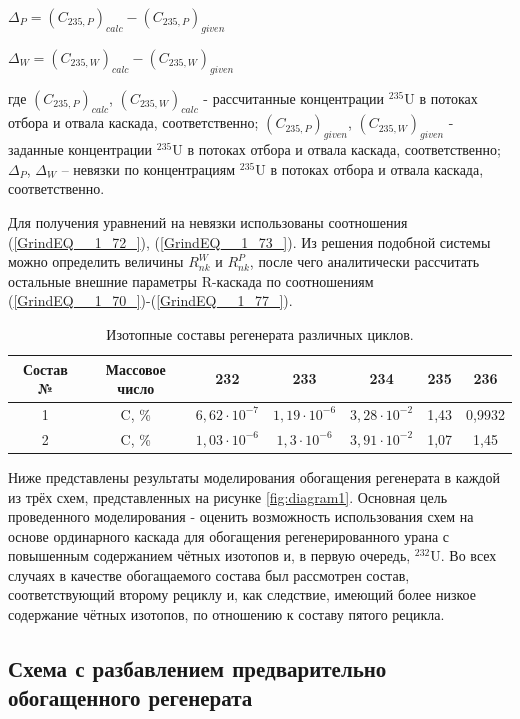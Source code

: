 $\Delta_{P} = {(C_{235, P})}_{calc}-{(C_{235, P})}_{given}$

$\Delta_{W} = {(C_{235, W})}_{calc}-{(C_{235, W})}_{given}$

где ${(C_{235, P})}_{calc}$, ${(C_{235, W})}_{calc}$ - рассчитанные концентрации $^{235}$U в потоках отбора и отвала каскада, соответственно; ${(C_{235, P})}_{given}$, ${(C_{235, W})}_{given}$ - заданные концентрации $^{235}$U в потоках отбора и отвала каскада, соответственно; $\Delta_{P}$, $\Delta_{W}$ -- невязки по концентрациям $^{235}$U в потоках отбора и отвала каскада, соответственно. 

Для получения уравнений на невязки использованы соотношения (\ref{GrindEQ__1_72_}), (\ref{GrindEQ__1_73_}). Из решения подобной системы можно определить величины $R_{n k}^{W}$ и $R_{n k}^{P}$, после чего аналитически рассчитать остальные внешние параметры R-каскада по соотношениям (\ref{GrindEQ__1_70_})-(\ref{GrindEQ__1_77_}).   


\begin{table}[h]
  \centering
  \normalsize\begin{tabulary}{1.0\textwidth}{|c|c|c|c|c|c|c|}
  \hline Состав № & Массовое число & 232 & 233 & 234 & 235 & 236 \\
   & C, \% & $6,62\cdot10^{-7}$ & $1,19\cdot10^{-6}$ & $3,28\cdot10^{-2}$ & 1,43 & 0,9932 \\
  2 & C, \% &  $1,03\cdot10^{-6}$ & $1,3\cdot10^{-6}$ & $3,91\cdot10^{-2}$ & 1,07 & 1,45 \\\hline
  \end{tabulary}
  \caption{{Изотопные составы регенерата различных циклов.{\label{is_compositions_2_5}}}}
\end{table}

Ниже представлены результаты моделирования обогащения регенерата в каждой из трёх схем, представленных на рисунке \ref{fig:diagram1}. 
Основная цель проведенного моделирования - оценить возможность использования схем на основе ординарного каскада для обогащения регенерированного урана с повышенным содержанием чётных изотопов и, в первую очередь, $^{232}$U. Во всех случаях в качестве обогащаемого состава был рассмотрен состав, соответствующий второму рециклу и, как следствие, имеющий более низкое содержание чётных изотопов, по отношению к составу пятого рецикла.

\subsection{Схема с разбавлением предварительно обогащенного регенерата}

